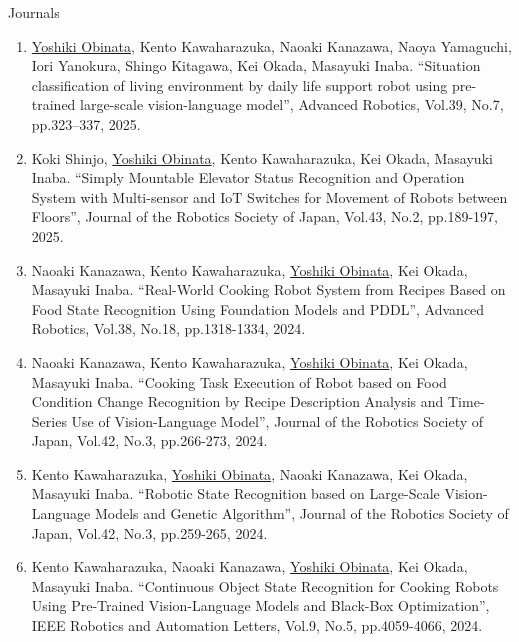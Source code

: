 \documentclass[a4paper,10pt]{article}
\newlength{\cvcolumngapwidth}
\newlength{\cvleftcolumnwidth}
\newlength{\cvrightcolumnwidth}
\newcommand{\cvheadingstyle}[1]{{\normalsize\cvheadingfont\textcolor{cvheadingcolor}{#1}}}
\newlength{\cvafteritemskipamount}
\newlength{\cvparskip}
\newcommand{\cvitem}[2]{
    \begin{minipage}[t]{\cvleftcolumnwidth}
        \raggedleft #1
    \end{minipage}%
    \hspace{\cvcolumngapwidth}%
    \begin{minipage}[t]{\cvrightcolumnwidth}
        \setlength{\parskip}{\cvparskip} #2
    \end{minipage}

    \vspace{\cvafteritemskipamount}
}
\begin{document}
\cvitem{
  \cvheadingstyle{Journals}
}{
  \begin{enumerate}
  \item \underline{Yoshiki Obinata}, Kento Kawaharazuka, Naoaki Kanazawa, Naoya Yamaguchi, Iori Yanokura, Shingo Kitagawa, Kei Okada, Masayuki Inaba. ``Situation classification of living environment by daily life support robot using pre-trained large-scale vision-language model'', Advanced Robotics, Vol.39, No.7, pp.323--337, 2025.
  \item Koki Shinjo, \underline{Yoshiki Obinata}, Kento Kawaharazuka, Kei Okada, Masayuki Inaba. ``Simply Mountable Elevator Status Recognition and Operation System with Multi-sensor and IoT Switches for Movement of Robots between Floors'', Journal of the Robotics Society of Japan, Vol.43, No.2, pp.189-197, 2025.
  \item Naoaki Kanazawa, Kento Kawaharazuka, \underline{Yoshiki Obinata}, Kei Okada, Masayuki Inaba. ``Real-World Cooking Robot System from Recipes Based on Food State Recognition Using Foundation Models and PDDL'', Advanced Robotics, Vol.38, No.18, pp.1318-1334, 2024.
  \item Naoaki Kanazawa, Kento Kawaharazuka, \underline{Yoshiki Obinata}, Kei Okada, Masayuki Inaba.
    ``Cooking Task Execution of Robot based on Food Condition Change Recognition by Recipe Description Analysis and Time-Series Use of Vision-Language Model'', Journal of the Robotics Society of Japan, Vol.42, No.3, pp.266-273, 2024.
  \item Kento Kawaharazuka, \underline{Yoshiki Obinata}, Naoaki Kanazawa, Kei Okada, Masayuki Inaba. ``Robotic State Recognition based on Large-Scale Vision-Language Models and Genetic Algorithm'', Journal of the Robotics Society of Japan, Vol.42, No.3, pp.259-265, 2024.
  \item Kento Kawaharazuka, Naoaki Kanazawa, \underline{Yoshiki Obinata}, Kei Okada, Masayuki Inaba. ``Continuous Object State Recognition for Cooking Robots Using Pre-Trained Vision-Language Models and Black-Box Optimization'', IEEE Robotics and Automation Letters, Vol.9, No.5, pp.4059-4066, 2024.
  \end{enumerate}
}
\end{document}
